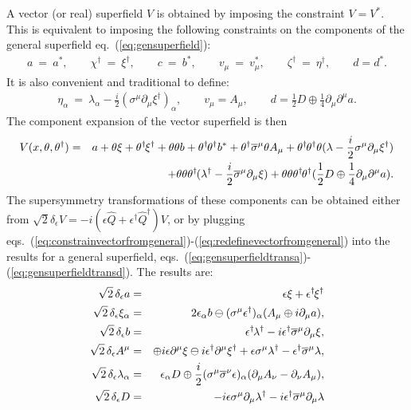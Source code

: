 \documentclass[12pt]{article}
\def\BDneg{-}
\def\BDplus{+}
\def\BDminus{-}
\def\thetasigmamuthetadagger{\theta\sigma^\mu\theta^\dagger}
\def\BDneg{}
\def\BDplus{-}
\def\BDminus{+}
\def\thetasigmamuthetadagger{\theta^\dagger\sigmabar^\mu\theta}
\def\BDneg{\ominus}
\def\BDplus{\oplus}
\def\BDminus{\ominus}
\def\thetasigmamuthetadagger{\theta\sigma^\mu\theta^\dagger}
\def\BDneg{\oplus}
\def\BDplus{\ominus}
\def\BDminus{\oplus}
\def\thetasigmamuthetadagger{\theta^\dagger\sigmabar^\mu\theta}
\newcommand{\thdthd}{\theta^\dagger\hspace{-1pt}\theta^\dagger}
\def\beq{\begin{eqnarray}}
\def\eeq{\end{eqnarray}}
\def\sigmabar{\overline\sigma}
\begin{document}
A vector (or real) superfield $V$ is obtained by
imposing the constraint $V = V^*$. 
This is equivalent to imposing the following constraints 
on the components of the
general superfield eq.~(\ref{eq:gensuperfield}):
\beq
a \> = \> a^*,
\qquad
\chi^\dagger \>=\> \xi^\dagger,
\qquad
c \> = \> b^*,
\qquad
v_\mu \>=\> v_\mu^*,
\qquad
\zeta^\dagger \>=\> \eta^\dagger,
\qquad
d = d^*.
\label{eq:constrainvectorfromgeneral}
\eeq
It is also convenient and traditional to define:
\beq
\eta_\alpha \>=\> \lambda_\alpha - \frac{i}{2} (\sigma^\mu \partial_\mu \xi^\dagger)_\alpha ,
\qquad
v_\mu = A_\mu,
\qquad
d = \frac{1}{2} D \BDminus \frac{1}{4} \partial_\mu \partial^\mu a.
\label{eq:redefinevectorfromgeneral}
\eeq
The component expansion of the vector superfield is then
\beq
V(x,\theta,\theta^\dagger) &=& 
a
+ \theta \xi 
+ \theta^\dagger\hspace{-1pt} \xi^\dagger 
+ \theta\theta b 
+ \thdthd b^* 
+ \thetasigmamuthetadagger  A_\mu 
+ \thdthd \theta 
  (\lambda - \frac{i}{2} \sigma^\mu \partial_\mu \xi^\dagger) 
\nonumber
\\
&&
+ \theta \theta  \theta^\dagger\hspace{-1pt} 
  (\lambda^\dagger - \frac{i}{2} \sigmabar^\mu \partial_\mu \xi)   
+ \theta\theta\thdthd 
  ( \frac{1}{2} D \BDminus \frac{1}{4} \partial_\mu \partial^\mu a).
\label{eq:vectorsuperfieldexpansion}
\eeq
The supersymmetry transformations of these components can be obtained either from
$\sqrt{2} \delta_\epsilon V = -i(\epsilon \hat Q + \epsilon^\dagger \hat Q^\dagger) V$,
or by plugging 
eqs.~(\ref{eq:constrainvectorfromgeneral})-(\ref{eq:redefinevectorfromgeneral}) 
into the results for
a general superfield,
eqs.~(\ref{eq:gensuperfieldtransa})-(\ref{eq:gensuperfieldtransd}).
The results are:
\beq
\sqrt{2}\,
\delta_\epsilon a &=& \epsilon \xi + \epsilon^\dagger\hspace{-1pt}\xi^\dagger
\\
\sqrt{2}\,
\delta_\epsilon \xi_{\alpha} &=& 2 \epsilon_\alpha b
\BDplus (\sigma^\mu \epsilon^\dagger)_\alpha (A_\mu \BDminus i \partial_\mu a)
,
\\
\sqrt{2}\,
\delta_\epsilon b &=& \epsilon^\dagger\hspace{-1pt} \lambda^\dagger 
- i \epsilon^\dagger \sigmabar^\mu \partial_\mu \xi
,
\\
\sqrt{2}\,
\delta_\epsilon A^\mu &=& 
\BDneg i \epsilon \partial^\mu \xi 
\BDplus i \epsilon^\dagger \partial^\mu \xi^\dagger
+ \epsilon \sigma^\mu \lambda^\dagger 
- \epsilon^\dagger \sigmabar^\mu \lambda ,
\\
\sqrt{2}\,
\delta_\epsilon \lambda_\alpha &=&
\epsilon_\alpha D \BDminus \frac{i}{2} (\sigma^\mu \sigmabar^\nu \epsilon)_\alpha
(\partial_\mu A_\nu - \partial_\nu A_\mu)
,
\\
\sqrt{2}\,
\delta_\epsilon D &=&
- i \epsilon \sigma^\mu \partial_\mu \lambda^\dagger
- i \epsilon^\dagger \sigmabar^\mu \partial_\mu \lambda
\label{eq:sqrttwodeltaD}
\eeq
\end{document}
